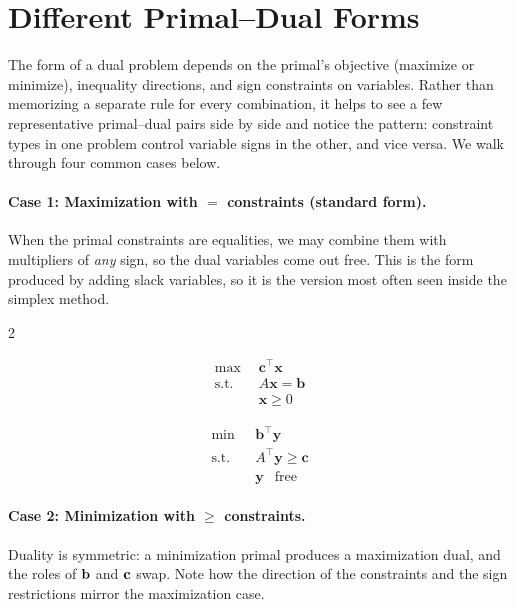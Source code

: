 \section{Different Primal–Dual Forms}
\label{sec:duality-forms}

The form of a dual problem depends on the primal's objective (maximize or minimize), inequality directions, and sign constraints on variables.  Rather than memorizing a separate rule for every combination, it helps to see a few representative primal--dual pairs side by side and notice the pattern: constraint types in one problem control variable signs in the other, and vice versa.  We walk through four common cases below.

\paragraph{Case 1: Maximization with $=$ constraints (standard form).}
When the primal constraints are equalities, we may combine them with multipliers of \emph{any} sign, so the dual variables come out free.  This is the form produced by adding slack variables, so it is the version most often seen inside the simplex method.

\begin{multicols}{2}
\begin{tcolorbox}[title=Primal (P), colback=blue!5, colframe=blue!40!black]
\[
\begin{aligned}
\max\ & \mathbf{c}^\top \mathbf{x} \\
\text{s.t.} \quad & A \mathbf{x} = \mathbf{b} \\
& \mathbf{x} \geq 0
\end{aligned}
\]
\end{tcolorbox}

\columnbreak

\begin{tcolorbox}[title=Dual (D), colback=green!5, colframe=green!40!black]
\[
\begin{aligned}
\min\ & \mathbf{b}^\top \mathbf{y} \\
\text{s.t.} \quad & A^\top \mathbf{y} \geq \mathbf{c} \\
& \mathbf{y} \ \ \text{ free}
\end{aligned}
\]
\end{tcolorbox}
\end{multicols}

\paragraph{Case 2: Minimization with $\geq$ constraints.}
Duality is symmetric: a minimization primal produces a maximization dual, and the roles of $\mathbf{b}$ and $\mathbf{c}$ swap.  Note how the direction of the constraints and the sign restrictions mirror the maximization case.


